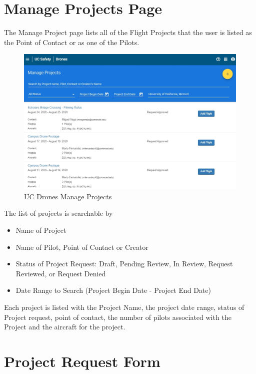 \documentclass[
]{book}
\providecommand{\tightlist}{%
  \setlength{\itemsep}{0pt}\setlength{\parskip}{0pt}}
\begin{document}
\hypertarget{manage-projects-page}{%
\section{Manage Projects Page}\label{manage-projects-page}}

The Manage Project page lists all of the Flight Projects that the user is listed as the Point of Contact or as one of the Pilots.

\begin{figure}

{\centering \includegraphics[width=0.85\linewidth]{images/UCDrones_manage_project} 

}

\caption{UC Drones Manage Projects}\label{fig:UCDrones-project}
\end{figure}

The list of projects is searchable by

\begin{itemize}
\tightlist
\item
  Name of Project
\item
  Name of Pilot, Point of Contact or Creator
\item
  Status of Project Request: Draft, Pending Review, In Review, Request Reviewed, or Request Denied
\item
  Date Range to Search (Project Begin Date - Project End Date)
\end{itemize}

Each project is listed with the Project Name, the project date range, status of Project request, point of contact, the number of pilots associated with the Project and the aircraft for the project.

\hypertarget{project-request-form}{%
\section{Project Request Form}\label{project-request-form}}
\end{document}
